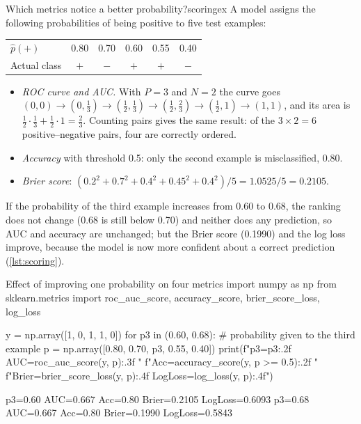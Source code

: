 \begin{example}{Which metrics notice a better probability?}{scoringex}
A model assigns the following probabilities of being positive to five test examples:
\begin{center}\small
\begin{tabular}{@{}lccccc@{}}
\toprule
$\hat p(+)$ & 0.80 & 0.70 & 0.60 & 0.55 & 0.40\\
Actual class & $+$ & $-$ & $+$ & $+$ & $-$\\
\bottomrule
\end{tabular}
\end{center}
\begin{itemize}
  \item \emph{ROC curve and AUC.} With $P=3$ and $N=2$ the curve goes
        $(0,0)\to(0,\tfrac13)\to(\tfrac12,\tfrac13)\to(\tfrac12,\tfrac23)\to(\tfrac12,1)\to(1,1)$,
        and its area is $\tfrac12\cdot\tfrac13+\tfrac12\cdot1=\tfrac23$. Counting pairs gives the
        same result: of the $3\times2=6$ positive--negative pairs, four are correctly ordered.
  \item \emph{Accuracy} with threshold 0.5: only the second example is misclassified, 0.80.
  \item \emph{Brier score}:
        $(0.2^2+0.7^2+0.4^2+0.45^2+0.4^2)/5=1.0525/5=0.2105$.
\end{itemize}
If the probability of the third example increases from 0.60 to 0.68, the ranking does not
change (0.68 is still below 0.70) and neither does any prediction, so AUC and accuracy are
unchanged; but the Brier score (0.1990) and the log loss improve, because the model is now
more confident about a correct prediction (\cref{lst:scoring}).
\end{example}

\begin{pylisting}[label={lst:scoring}]{Effect of improving one probability on four metrics}
import numpy as np
from sklearn.metrics import roc_auc_score, accuracy_score, brier_score_loss, log_loss

y = np.array([1, 0, 1, 1, 0])
for p3 in (0.60, 0.68):                       # probability given to the third example
    p = np.array([0.80, 0.70, p3, 0.55, 0.40])
    print(f"p3={p3:.2f}  AUC={roc_auc_score(y, p):.3f}  "
          f"Acc={accuracy_score(y, p >= 0.5):.2f}  "
          f"Brier={brier_score_loss(y, p):.4f}  LogLoss={log_loss(y, p):.4f}")
\end{pylisting}
\begin{pyoutput}
p3=0.60  AUC=0.667  Acc=0.80  Brier=0.2105  LogLoss=0.6093
p3=0.68  AUC=0.667  Acc=0.80  Brier=0.1990  LogLoss=0.5843
\end{pyoutput}

